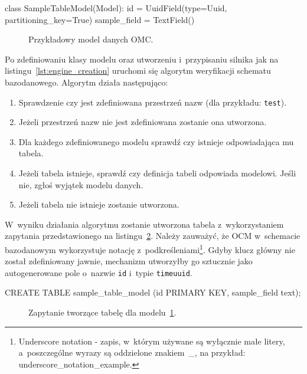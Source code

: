 \begin{verbbox}
class SampleTableModel(Model):
    id = UuidField(type=Uuid, partitioning_key=True)
    sample_field = TextField()
\end{verbbox}

\begin{figure}[ht!]
	\centering
	\theverbbox
	\caption{Przykładowy model danych OMC.}
	\label{lst:sample_model}
\end{figure}

Po zdefiniowaniu klasy modelu oraz utworzeniu i~przypisaniu silnika jak na listingu~\ref{lst:engine_creation} uruchomi się algorytm weryfikacji schematu bazodanowego. Algorytm działa następująco:

\begin{enumerate}
	\item Sprawdzenie czy jest zdefiniowana przestrzeń nazw (dla przykładu: \verb+test+). 
	\item Jeżeli przestrzeń nazw nie jest zdefiniowana zostanie ona utworzona.
	\item Dla każdego zdefiniowanego modelu sprawdź czy istnieje odpowiadająca mu tabela.
	\item Jeżeli tabela istnieje, sprawdź czy definicja tabeli odpowiada modelowi. Jeśli nie, zgłoś wyjątek modelu danych.
	\item Jeżeli tabela nie istnieje zostanie utworzona.
\end{enumerate} 

W~wyniku działania algorytmu zostanie utworzona tabela z~wykorzystaniem zapytania przedstawionego na listingu~\ref{lst:sample_model_create_query}. Należy zauważyć, że OCM w~schemacie bazodanowym wykorzystuje notację z~podkreśleniami\footnote{Underscore notation - zapis, w~którym używane są wyłącznie małe litery, a~poszczególne wyrazy są oddzielone znakiem~\_, na przykład: underscore\_notation\_example.}. Gdyby klucz główny nie został zdefiniowany jawnie, mechanizm utworzyłby go sztucznie jako autogenerowane pole o~nazwie \verb+id+ i~typie \verb+timeuuid+.

\begin{verbbox}
CREATE TABLE sample_table_model (id PRIMARY KEY, sample_field text);
\end{verbbox}

\begin{figure}[ht!]
	\centering
	\theverbbox
	\caption{Zapytanie tworzące tabelę dla modelu~\ref{lst:sample_model}.}
	\label{lst:sample_model_create_query}
\end{figure}

